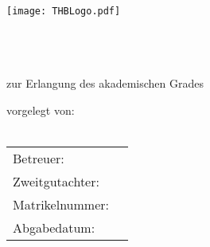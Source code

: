 \begin{titlepage}
\setcounter{page}{0} %
\begin{center}

\texttt{[image: THBLogo.pdf]}



\vspace{2cm}
{\Large \textsf{\textbf{\myTitel}} } \\
\vspace{0.5cm}
{\large \textsf{\textbf{\myUntertitel}} } \\

\vspace{2cm}
{\large \textsf{\textbf{\myThesisArt}} } \\

\vspace{1cm}
zur Erlangung des akademischen Grades\\
\vspace{0.5cm}
{\large \myAkademischerGrad}


\vspace{1.5cm}

vorgelegt von:\\
\vspace{0.5cm}
{\Large \myAutor} \\

\vfill
\begin{tabular}{ l l }
	Betreuer: & \myBetreuer \\
	Zweitgutachter: & \myZweitgutachter \\
	Matrikelnummer: & \myMatrikelNr \\
	Abgabedatum: & \myAbgabeDatum \\
\end{tabular}
\end{center}
\end{titlepage}
\restoregeometry %